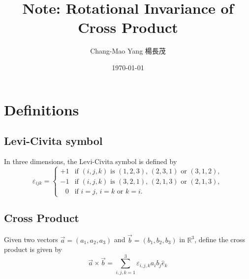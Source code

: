 \documentclass[12pt]{article}
\title{Note: Rotational Invariance of Cross Product}
\date{\today}
\author{Chang-Mao Yang 楊長茂}
\begin{document}
\maketitle
\tableofcontents
\section{Definitions}

\subsection{Levi-Civita symbol}
In three dimensions, the Levi-Civita symbol is defined by
\begin{equation}
\varepsilon _{ijk} =
\begin{cases}
+1	&	\text{if $(i,j,k)$ is $(1,2,3)$, $(2,3,1)$ or $(3,1,2)$},\\
-1	&	\text{if $(i,j,k)$ is $(3,2,1)$, $(2,1,3)$ or $(2,1,3)$},\\
\;\;\,0&\text{if $i=j$, $i=k$ or $k=i$}.
\end{cases}
\end{equation}
\subsection{Cross Product}
Given two vectors $\vec{a}=(a_1,a_2,a_3)$ and $\vec{b}=(b_1,b_2,b_3)$ in $\mathbb{R}^3$, define the cross product is given by
\begin{equation}
\vec{a} \times \vec{b} = \sum_{i,j,k=1}^{3}\varepsilon_{i,j,k} a_{i} b_{j} \hat{e}_{k}
\end{equation}
\end{document}
